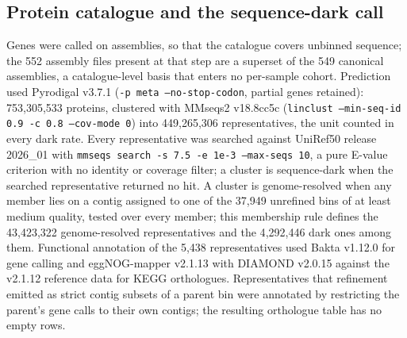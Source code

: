 \subsection*{Protein catalogue and the sequence-dark call}
Genes were called on assemblies, so that the catalogue covers unbinned sequence;
the 552 assembly files present at that step are a superset of the 549 canonical assemblies, a
catalogue-level basis that enters no per-sample cohort. Prediction used Pyrodigal v3.7.1 \citep{larralde2022pyrodigal,hyatt2010prodigal}
(\texttt{-p meta --no-stop-codon}, partial genes retained): 753{,}305{,}533 proteins, clustered with
MMseqs2 v18.8cc5c \citep{steinegger2017mmseqs2,steinegger2018linclust} (\texttt{linclust
--min-seq-id 0.9 -c 0.8 --cov-mode 0}) into 449{,}265{,}306 representatives, the unit counted in
every dark rate. Every representative was searched against UniRef50 release 2026\_01
\citep{suzek2015uniref} with \texttt{mmseqs search -s 7.5 -e 1e-3 --max-seqs 10}, a pure E-value
criterion with no identity or coverage filter; a cluster is sequence-dark when the searched representative
returned no hit. A cluster is genome-resolved when any member lies on a contig assigned to one of the
37{,}949 unrefined bins of at least medium quality, tested over every member; this membership rule
defines the 43{,}423{,}322 genome-resolved representatives and the 4{,}292{,}446
dark ones among them. Functional annotation of the 5{,}438 representatives used Bakta v1.12.0
\citep{schwengers2021bakta} for gene calling and eggNOG-mapper v2.1.13 \citep{cantalapiedra2021eggnog}
with DIAMOND v2.0.15 \citep{buchfink2021diamond} against the v2.1.12 reference data for KEGG
orthologues. Representatives that refinement emitted as strict contig subsets of a parent bin were
annotated by restricting the parent's gene calls to their own contigs; the resulting orthologue table has no empty rows.

